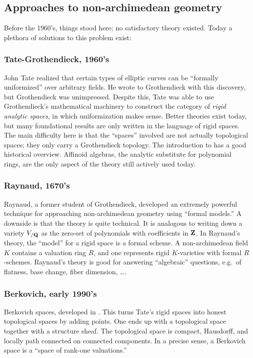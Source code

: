 \subsection{Approaches to non-archimedean geometry}

Before the 1960's, things stood here; no satisfactory theory existed. Today 
a plethora of solutions to this problem exist:

\subsubsection{Tate-Grothendieck, 1960's}
John Tate realized that certain types of 
elliptic curves can be ``formally uniformized'' over arbitrary fields. He wrote 
to Grothendieck with this discovery, but Grothendieck was unimpressed. Despite 
this, Tate was able to use Grothendieck's mathematical machinery to construct 
the category of \emph{rigid analytic spaces}, in which uniformization makes 
sense. Better theories exist today, but many foundational results are only 
written in the language of rigid spaces. The main difficulty here is that the 
``spaces'' involved are not actually topological spaces; they only carry a 
Grothendieck topology. The introduction to \cite{aws-2008} has a good 
historical overview. Affinoid algebras, the analytic substitute for polynomial 
rings, are the only aspect of the theory still actively used today. 

\subsubsection{Raynaud, 1670's}
Raynaud, a former student of Grothendieck, developed an extremely 
powerful technique for approaching non-archimedean geometry using ``formal 
models.'' A downside is that the theory is quite technical. It is analogous to 
writing down a variety $V_{/\mathbf{Q}}$ as the zero-set of polynomials with 
coefficients in $\mathbf{Z}$. In Raynaud's theory, the ``model'' for a rigid space is 
a formal scheme. A non-archimedean field $K$ contains a valuation ring $R$, and 
one represents rigid $K$-varieties with formal $R$-schemes. Raynaud's theory is 
good for answering ``algebraic'' questions, e.g.~of flatness, base change, 
fiber dimension, \ldots. 

\subsubsection{Berkovich, early 1990's}
Berkovich spaces, developed in \cite{berkovich-1990}. This turns Tate's 
rigid spaces into honest topological spaces by adding points. One ends up with 
a topological space together with a structure sheaf. The topological space is 
compact, Hausdorff, and locally path connected on connected components. In a 
precise sense, a Berkovich space is a ``space of rank-one valuations.'' 

